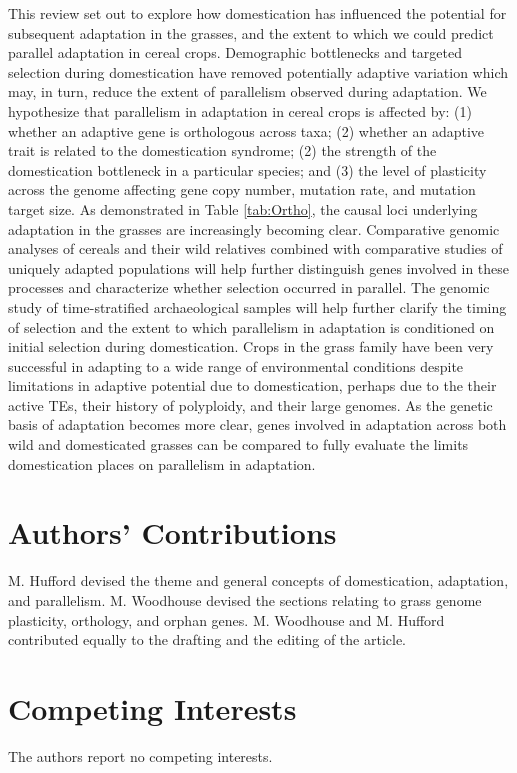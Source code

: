 \documentclass[12pt]{article}
\begin{document}
This review set out to explore how domestication has influenced the potential for subsequent adaptation in the grasses, and the extent to which we could predict parallel adaptation in cereal crops. 
Demographic bottlenecks and targeted selection during domestication have removed potentially adaptive variation which may, in turn, reduce the extent of parallelism observed during adaptation.
We hypothesize that parallelism in adaptation in cereal crops is affected by:  (1) whether an adaptive gene is orthologous across taxa; (2) whether an adaptive trait is related to the domestication syndrome; (2) the strength of the domestication bottleneck in a particular species; and (3) the level of plasticity across the genome affecting gene copy number, mutation rate, and mutation target size.
As demonstrated in Table \ref{tab:Ortho}, the causal loci underlying adaptation in the grasses are increasingly becoming clear.
Comparative genomic analyses of cereals and their wild relatives combined with comparative studies of uniquely adapted populations will help further distinguish genes involved in these processes and characterize whether selection occurred in parallel.
The genomic study of time-stratified archaeological samples will help further clarify the timing of selection and the extent to which parallelism in adaptation is conditioned on initial selection during domestication.
Crops in the grass family have been very successful in adapting to a wide range of environmental conditions despite limitations in adaptive potential due to domestication, perhaps due to the their active TEs, their history of polyploidy, and their large genomes.
As the genetic basis of adaptation becomes more clear, genes involved in adaptation across both wild and domesticated grasses can be compared to fully evaluate the limits domestication places on parallelism in adaptation. 

\section*{Authors' Contributions}
M. Hufford devised the theme and general concepts of domestication, adaptation, and parallelism. M. Woodhouse devised the sections relating to grass genome plasticity, orthology, and orphan genes. M. Woodhouse and M. Hufford contributed equally to the drafting and the editing of the article.

\section*{Competing Interests}
The authors report no competing interests.
\end{document}
